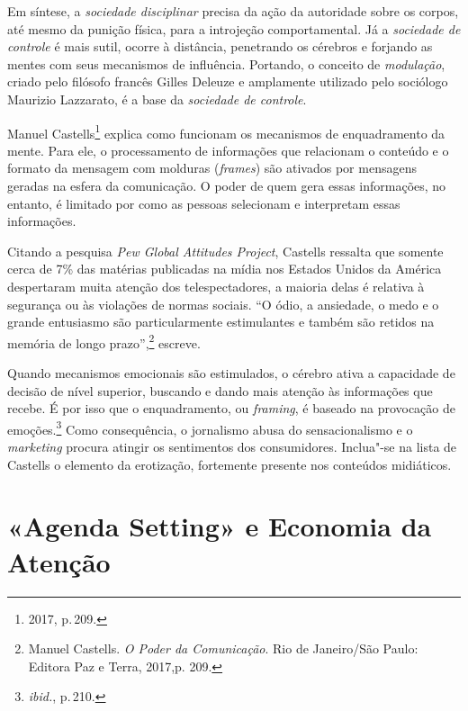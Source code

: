 Em síntese, a \emph{sociedade disciplinar} precisa da ação da autoridade
sobre os corpos, até mesmo da punição física, para a introjeção
comportamental. Já a \emph{sociedade de controle} é mais sutil, ocorre à
distância, penetrando os cérebros e forjando as mentes com seus
mecanismos de influência. Portando, o conceito de \emph{modulação},
criado pelo filósofo francês Gilles Deleuze e amplamente utilizado pelo
sociólogo Maurizio Lazzarato, é a base da \emph{sociedade de controle}.

Manuel Castells\footnote{2017, p.\,209.} explica como funcionam os mecanismos de
enquadramento da mente. Para ele, o processamento de informações que
relacionam o conteúdo e o formato da mensagem com molduras
(\emph{frames}) são ativados por mensagens geradas na esfera da
comunicação. O poder de quem gera essas informações, no entanto, é
limitado por como as pessoas selecionam e interpretam essas informações.

Citando a pesquisa \emph{Pew Global Attitudes Project}, Castells
ressalta que somente cerca de 7\% das matérias publicadas na mídia nos
Estados Unidos da América despertaram muita atenção dos telespectadores,
a maioria delas é relativa à segurança ou às violações de normas
sociais. ``O ódio, a ansiedade, o medo e o grande entusiasmo são
particularmente estimulantes e também são retidos na memória de longo
prazo'',\footnote{Manuel Castells. \emph{O Poder da Comunicação}.
Rio de Janeiro/São Paulo: Editora Paz e Terra, 2017,p. 209.} escreve. 

Quando mecanismos emocionais
são estimulados, o cérebro ativa a capacidade de decisão de nível
superior, buscando e dando mais atenção às informações que recebe. É por
isso que o enquadramento, ou \emph{framing}, é baseado na provocação de
emoções.\footnote{\emph{ibid.}, p.\,210.} Como consequência, o jornalismo abusa do
sensacionalismo e o \emph{marketing} procura atingir os sentimentos dos
consumidores. Inclua"-se na lista de Castells o elemento da erotização,
fortemente presente nos conteúdos midiáticos.

\section{«Agenda Setting» e Economia da Atenção}

